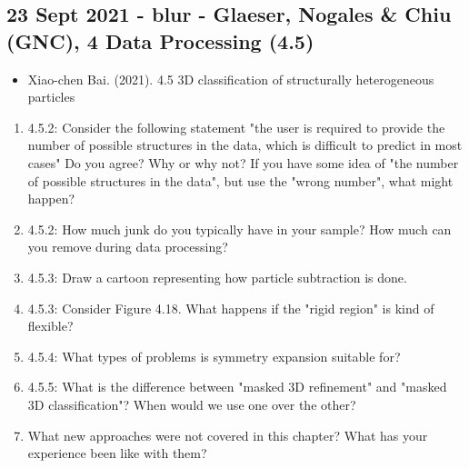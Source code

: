 \documentclass[11pt, oneside]{article}   	%
\begin{document}
\subsection{23 Sept 2021 - blur - Glaeser, Nogales \& Chiu (GNC), 4 Data Processing (4.5)}
\begin{itemize}
	\item Xiao-chen Bai. (2021). 4.5 3D classification of structurally heterogeneous particles
\end{itemize}
\begin{enumerate}
	\item 4.5.2: Consider the following statement "the user is required to provide the number of possible structures in the data, which is difficult to predict in most cases" Do you agree? Why or why not? If you have some idea of "the number of possible structures in the data", but use the "wrong number", what might happen?
	\item 4.5.2: How much junk do you typically have in your sample? How much can you remove during data processing?
	\item 4.5.3: Draw a cartoon representing how particle subtraction is done. 
	\item 4.5.3: Consider Figure 4.18. What happens if the "rigid region" is kind of flexible?
	\item 4.5.4: What types of problems is symmetry expansion suitable for?
	\item 4.5.5: What is the difference between "masked 3D refinement" and "masked 3D classification"? When would we use one over the other?
	\item What new approaches were not covered in this chapter? What has your experience been like with them?
\end{enumerate}
\end{document}
